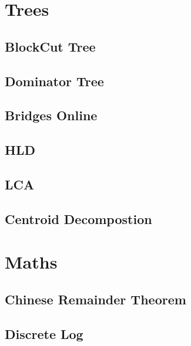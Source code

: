 \section{Trees}
\subsection{BlockCut Tree}
\raggedbottom
\subsection{Dominator Tree}
\raggedbottom
\subsection{Bridges Online}
\raggedbottom
\subsection{HLD}
\raggedbottom
\subsection{LCA}
\raggedbottom
\subsection{Centroid Decompostion}
\raggedbottom

\section{Maths}
\subsection{Chinese Remainder Theorem}
\raggedbottom
\subsection{Discrete Log}
\raggedbottom
